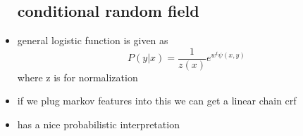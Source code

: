 \documentclass{article}
\begin{document}
\begin{itemize}
\subsection*{conditional random field}
\item general logistic function is given as $$P(y|x)=\frac{1}{z(x)}e^{w^{t}\psi(x,y)}$$ where z is for normalization 
\item if we plug markov features into this we can get a linear chain crf 
\item has a nice probabilistic interpretation 
\end{itemize}
\end{document}

